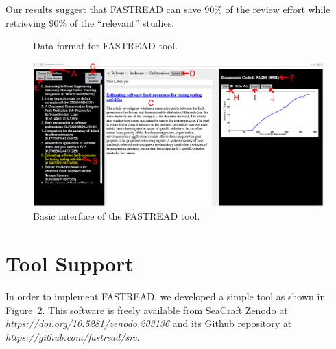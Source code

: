 \documentclass[final,twocolumn,5p]{elsarticle}
\theoremstyle{break}
\begin{document}
\begin{lesson}
    Our results suggest that FASTREAD can save $90\%$ of the review effort while retrieving $90\%$ of the ``relevant'' studies.
\end{lesson}






\begin{figure}[ht]
    \centering
    
    \caption{Data format for FASTREAD tool.}
    \label{fig:csv}
\end{figure}
\begin{figure}[ht]
    \centering
    \includegraphics[width=\linewidth]{MAR.png}
    \caption{Basic interface of the FASTREAD tool.}
    \label{fig:FASTREAD}
\end{figure}

\section{Tool Support}
\label{sect: tool}

In order to implement FASTREAD, we developed a simple tool as shown in Figure~\ref{fig:FASTREAD}. This software is freely available from SeaCraft Zenodo at \textit{https://doi.org/10.5281/zenodo.203136} and its Github repository at \textit{https://github.com/fastread/src}. 
\end{document}
